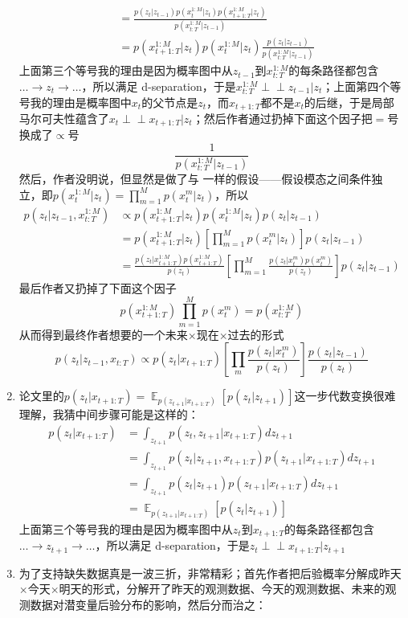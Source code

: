 \documentclass[11pt]{article}
\begin{document}
\begin{enumerate}
\[\begin{split}
&=\frac{p(z_t|z_{t-1})p(x_t^{1:M}|z_t)p(x_{t+1:T}^{1:M}|z_t)}{p(x_{t:T}^{1:M}|z_{t-1})}\\
&=p(x_{t+1:T}^{1:M}|z_t)p(x_t^{1:M}|z_t)\frac{p(z_t|z_{t-1})}{p(x_{t:T}^{1:M}|z_{t-1})}
\end{split}
\]上面第三个等号我的理由是因为概率图中从$z_{t-1}$到$x_{t:T}^{1:M}$的每条路径都包含$\dots\to z_{t}\to\dots$，所以满足 d-separation，于是$x_{t:T}^{1:M}\perp\!\!\!\perp z_{t-1}|z_{t}$；上面第四个等号我的理由是概率图中$x_t$的父节点是$z_t$，而$x_{t+1:T}$都不是$x_t$的后继，于是局部马尔可夫性蕴含了$x_t\perp\!\!\!\perp x_{t+1:T}|z_t$；然后作者通过扔掉下面这个因子把$=$号换成了$\propto$号\[
\frac{1}{p(x_{t:T}^{1:M}|z_{t-1})}
\]然后，作者没明说，但显然是做了与 \cite{NIPS2018_7801} 一样的假设——假设模态之间条件独立，即$p(x_t^{1:M}|z_t)=\prod_{m=1}^M p(x_t^m|z_t)$，所以\[
\begin{split}
p(z_t|z_{t-1},x_{t:T}^{1:M})&\propto p(x_{t+1:T}^{1:M}|z_t)p(x_t^{1:M}|z_t)p(z_t|z_{t-1})\\
&= p(x_{t+1:T}^{1:M}|z_t)\left[
\prod_{m=1}^M p(x_t^m|z_t)
\right]
p(z_t|z_{t-1})\\
&=\frac{p(z_t|x_{t+1:T}^{1:M})p(x_{t+1:T}^{1:M})}{p(z_t)}\left[
\prod_{m=1}^M \frac{p(z_t|x_t^m)p(x_t^m)}{p(z_t)}
\right]
p(z_t|z_{t-1})
\end{split}
\]最后作者又扔掉了下面这个因子\[
p(x_{t+1:T}^{1:M})\prod_{m=1}^M p(x_t^m)=p(x_{t:T}^{1:M})
\]从而得到最终作者想要的一个未来$\times$现在$\times$过去的形式\[
p(z_t|z_{t-1},x_{t:T})\propto p(z_t|x_{t+1:T})\left[\prod_m \frac{p(z_t|x_t^m)}{p(z_t)}\right]\frac{p(z_t|z_{t-1})}{p(z_t)}
\]
\item 论文里的$p(z_t|x_{t+1:T})=\mathop{\mathbb{E}}_{p(z_{t+1}|x_{t+1:T})}[p(z_t|z_{t+1})]$这一步代数变换很难理解，我猜中间步骤可能是这样的：\[
\begin{split}
p(z_t|x_{t+1:T})&=\int_{z_{t+1}}p(z_t,z_{t+1}|x_{t+1:T})dz_{t+1}\\
&=\int_{z_{t+1}}p(z_t|z_{t+1},x_{t+1:T})p(z_{t+1}|x_{t+1:T})dz_{t+1}\\
&=\int_{z_{t+1}}p(z_t|z_{t+1})p(z_{t+1}|x_{t+1:T})dz_{t+1}\\
&=\mathop{\mathbb{E}}_{p(z_{t+1}|x_{t+1:T})}[p(z_t|z_{t+1})]
\end{split}
\]上面第三个等号我的理由是因为概率图中从$z_t$到$x_{t+1:T}$的每条路径都包含$\dots\to z_{t+1}\to\dots$，所以满足 d-separation，于是$z_t\perp\!\!\!\perp x_{t+1:T}|z_{t+1}$
\item \cite{Tan2019FactorizedII} 为了支持缺失数据真是一波三折，非常精彩；首先作者把后验概率分解成昨天$\times$今天$\times$明天的形式，分解开了昨天的观测数据、今天的观测数据、未来的观测数据对潜变量后验分布的影响，然后分而治之：

\end{enumerate}
\end{document}
